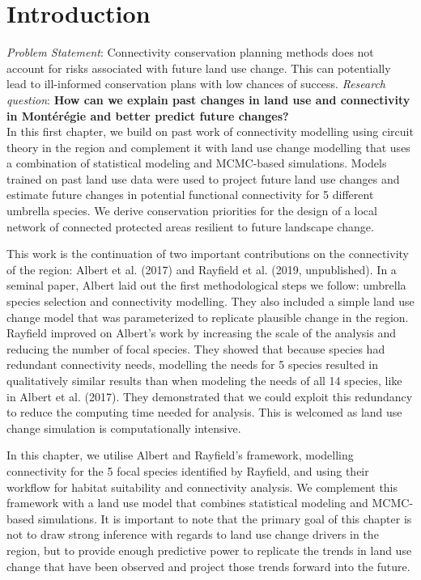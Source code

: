\section{Introduction}
\textit{Problem Statement}: Connectivity conservation planning methods does not account for risks associated with future land use change. This can potentially lead to ill-informed conservation plans with low chances of success.
\textit{Research question}: \textbf{How can we explain past changes in land use and connectivity in Montérégie and better predict future changes?}\\

In this first chapter, we build on past work of connectivity modelling using circuit theory in the region and complement it with land use change modelling that uses a combination of statistical modeling and MCMC-based simulations. Models trained on past land use data were used to project future land use changes and estimate future changes in potential functional connectivity for 5 different umbrella species. We derive conservation priorities for the design of a local network of connected protected areas resilient to future landscape change.

This work is the continuation of two important contributions on the connectivity of the region: Albert et al. (2017) and Rayfield et al. (2019, unpublished). In a seminal paper, Albert laid out the first methodological steps we follow: umbrella species selection and connectivity modelling. They also included a simple land use change model that was parameterized to replicate plausible change in the region. Rayfield improved on Albert’s work by increasing the scale of the analysis and reducing the number of focal species. They showed that because species had redundant connectivity needs, modelling the needs for 5 species resulted in qualitatively similar results than when modeling the needs of all 14 species, like in Albert et al. (2017). They demonstrated that we could exploit this redundancy to reduce the computing time needed for analysis. This is welcomed as land use change simulation is computationally intensive.

In this chapter, we utilise Albert and Rayfield’s framework, modelling connectivity for the 5 focal species identified by Rayfield, and using their workflow for habitat suitability and connectivity analysis. We complement this framework with a land use model that combines statistical modeling and MCMC-based simulations. It is important to note that the primary goal of this chapter is not to draw strong inference with regards to land use change drivers in the region, but to provide enough predictive power to replicate the trends in land use change that have been observed and project those trends forward into the future.

